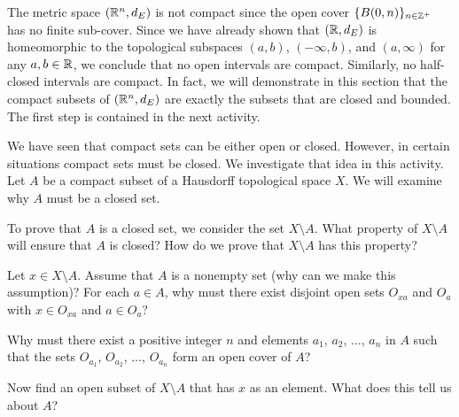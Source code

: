 
The metric space $(\mathbb{R}^n,d_E)$ is not compact since the open cover $\{B(0, n)\}_{n \in \mathbb{Z}^+}$ has no finite sub-cover.  Since we have already shown that $(\mathbb{R},d_E)$ is homeomorphic to the topological subspaces $(a,b)$, $(-\infty, b)$, and $(a,\infty)$ for any $a, b \in \mathbb{R}$, we conclude that no open intervals are compact. Similarly, no half-closed intervals are compact. In fact, we will demonstrate in this section that the compact subsets of $(\mathbb{R}^n, d_E)$ are exactly the subsets that are closed and bounded. The first step is contained in the next activity.

\begin{activity} \label{act:metric_compact_closed} We have seen that compact sets can be either open or closed. However, in certain situations compact sets must be closed. We investigate that idea in this activity. Let $A$ be a compact subset of a Hausdorff topological space $X$. We will examine why $A$ must be a closed set.
\ba
\item To prove that $A$ is a closed set, we consider the set $X \setminus A$. What property of $X \setminus A$ will ensure that $A$ is closed? How do we prove that $X \setminus A$ has this property?

\item Let $x \in X \setminus A$. Assume that $A$ is a nonempty set (why can we make this assumption)? For each $a \in A$, why must there exist disjoint open sets $O_{xa}$ and $O_a$ with $x \in O_{xa}$ and $a \in O_a$? 

\item Why must there exist a positive integer $n$ and elements $a_1$, $a_2$, $\ldots$, $a_n$ in $A$ such that the sets $O_{a_1}$, $O_{a_2}$, $\ldots$, $O_{a_n}$ form an open cover of $A$?

\item Now find an open subset of $X \setminus A$ that has $x$ as an element. What does this tell us about $A$?

\ea

\end{activity}

